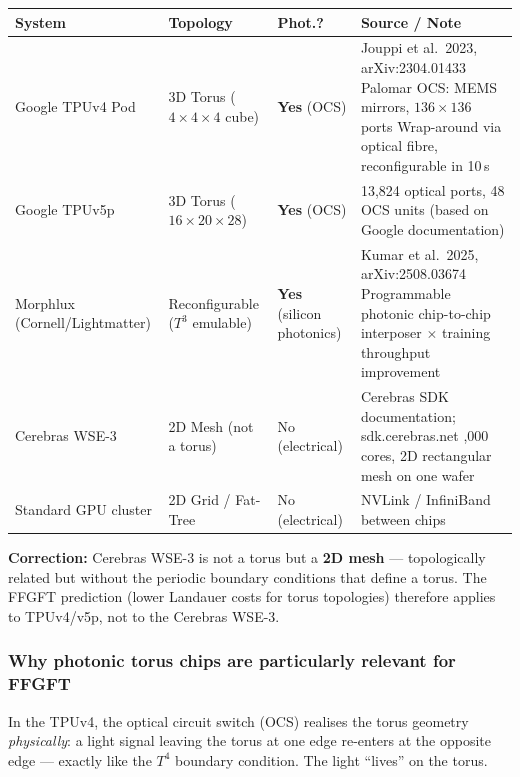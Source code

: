 \begin{center}
\renewcommand{\arraystretch}{1.4}
{\footnotesize
\begin{tabular}{p{4.0cm}p{3.0cm}p{2.0cm}p{6.5cm}}
\toprule
\textbf{System} & \textbf{Topology} & \textbf{Phot.?} & \textbf{Source / Note} \\
\midrule
Google TPUv4 Pod
  & 3D Torus ($4{\times}4{\times}4$ cube)
  & \textbf{Yes} (OCS)
  & Jouppi et al.\ 2023, arXiv:2304.01433 \newline
    Palomar OCS: MEMS mirrors, $136{\times}136$ ports \newline
    Wrap-around via optical fibre, reconfigurable in 10\,s \\[4pt]
Google TPUv5p
  & 3D Torus ($16{\times}20{\times}28$)
  & \textbf{Yes} (OCS)
  & 13,824 optical ports, 48 OCS units \newline
    (based on Google documentation) \\[4pt]
Morphlux (Cornell/Lightmatter)
  & Reconfigurable ($T^3$ emulable)
  & \textbf{Yes} (silicon photonics)
  & Kumar et al.\ 2025, arXiv:2508.03674 \newline
    Programmable photonic chip-to-chip interposer \newline
    1.72$\times$ training throughput improvement \\[4pt]
Cerebras WSE-3
  & 2D Mesh (not a torus)
  & No (electrical)
  & Cerebras SDK documentation; sdk.cerebras.net \newline
    900,000 cores, 2D rectangular mesh on one wafer \\[4pt]
Standard GPU cluster
  & 2D Grid / Fat-Tree
  & No (electrical)
  & NVLink / InfiniBand between chips \\
\bottomrule
\end{tabular}
}
\end{center}

\textbf{Correction:}
Cerebras WSE-3 is not a torus but a \textbf{2D mesh} ---
topologically related but without the periodic boundary conditions
that define a torus. The FFGFT prediction (lower Landauer costs
for torus topologies) therefore applies to TPUv4/v5p,
not to the Cerebras WSE-3.

\subsubsection*{Why photonic torus chips are particularly relevant for FFGFT}

In the TPUv4, the optical circuit switch (OCS) realises the torus geometry
\emph{physically}: a light signal leaving the torus at one edge re-enters
at the opposite edge --- exactly like the $T^4$ boundary condition.
The light ``lives'' on the torus.

